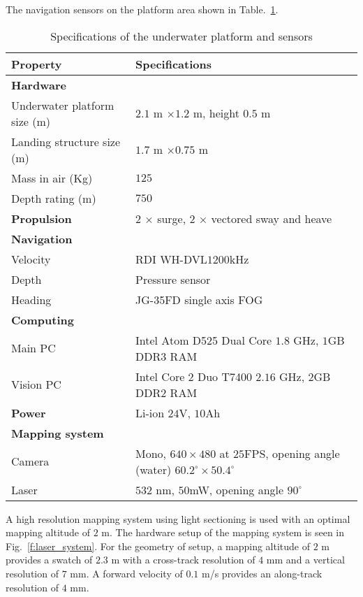 The navigation sensors on the platform area shown in Table.~\ref{t:auv_specs}.

\begin{table}[!ht]
\centering
\caption{Specifications of the underwater platform and sensors}
\begin{tabular}{  |p{4cm}  p{10cm} | }
\hline
\textbf{Property} & \textbf{Specifications}\\ \hline 
\textbf{Hardware} & \\
Underwater platform size (m) &  $2.1$ m $\times 1.2$ m, height $0.5$ m \\
Landing structure size (m) &  $1.7$ m $\times 0.75$ m\\
Mass in air (Kg) & $125$\\
Depth rating (m) & $750$\\
\hline
\textbf{Propulsion} & 2 $\times$ surge, 2 $\times$ vectored sway and heave\\
\hline 
\textbf{Navigation} & \\
Velocity & RDI WH-DVL$1200$kHz \\
Depth & Pressure sensor \\
Heading &  JG-35FD single axis FOG \\
\hline
\textbf{Computing} & \\
Main PC & Intel Atom D525 Dual Core $1.8$ GHz, $1$GB DDR$3$ RAM  \\
Vision PC  & Intel Core 2 Duo T7400 $2.16$ GHz, $2$GB DDR$2$ RAM \\
\hline
\textbf{Power} & Li-ion $24$V, $10$Ah \\ 
\hline
\textbf{Mapping system} & \\
Camera & Mono, $640 \times 480$ at $25$FPS, opening angle (water) $60.2^{\circ} \times 50.4^{\circ}$\\
Laser & $532$ nm, $50$mW, opening angle $90^{\circ}$ \\
\hline 

\end{tabular}
\label{t:auv_specs}
\end{table}

A high resolution mapping system using light sectioning is used with an optimal mapping altitude of $2$ m. The hardware setup of the mapping system is seen in Fig.~\ref{f:laser_system}. For the geometry of setup, a mapping altitude of $2$ m provides a swatch of $2.3$ m with a cross-track resolution of $4$ mm and a vertical resolution of $7$ mm. A forward velocity of $0.1$ m/s provides an along-track resolution of $4$ mm. 

